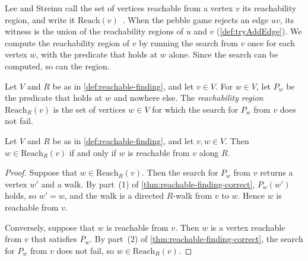 Lee and Streinu call the set of vertices reachable from a vertex $v$
its reachability region, and write it
$\mathrm{Reach}(v)$~\cite[\S 4]{leeStreinu2008}. When the pebble game
rejects an edge $uv$, its witness is the union of the reachability
regions of $u$ and $v$ (\cref{def:tryAddEdge}). We compute the
reachability region of $v$ by running the search from $v$ once for
each vertex $w$, with the predicate that holds at $w$ alone. Since the
search can be computed, so can the region.

\begin{definition}
  \label{def:reachClosureComputable}
  \leanok
  Let $V$ and $R$ be as in \cref{def:reachable-finding}, and let
  $v \in V$. For $w \in V$, let $P_w$ be the predicate that holds at
  $w$ and nowhere else. The \emph{reachability region}
  $\mathrm{Reach}_R(v)$ is the set of vertices $w \in V$ for which the
  search for $P_w$ from $v$ does not fail.
\end{definition}

\begin{lemma}
  \label{lem:mem-reachClosureComputable}
  \leanok
  Let $V$ and $R$ be as in \cref{def:reachable-finding}, and let
  $v, w \in V$. Then $w \in \mathrm{Reach}_R(v)$ if and only if $w$ is
  reachable from $v$ along $R$.
\end{lemma}
\begin{proof}
  \leanok
  Suppose that $w \in \mathrm{Reach}_R(v)$. Then the search for $P_w$
  from $v$ returns a vertex $w'$ and a walk. By part~(1) of
  \cref{thm:reachable-finding-correct}, $P_w(w')$ holds, so $w' = w$,
  and the walk is a directed $R$-walk from $v$ to $w$. Hence $w$ is
  reachable from $v$.

  Conversely, suppose that $w$ is reachable from $v$. Then $w$ is a
  vertex reachable from $v$ that satisfies $P_w$. By part~(2) of
  \cref{thm:reachable-finding-correct}, the search for $P_w$ from $v$
  does not fail, so $w \in \mathrm{Reach}_R(v)$.
\end{proof}

